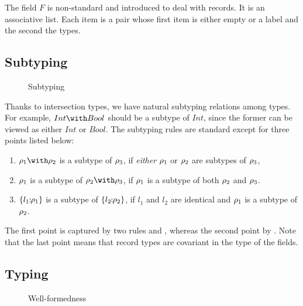 The field $ F $ is non-standard and introduced to deal with records. It is an
associative list. Each item is a pair whose first item is either empty or a
label and the second the types.




\subsection{Subtyping}

\begin{figure*}

\caption{Subtyping}
\end{figure*}

Thanks to intersection types, we have natural subtyping relations among types.
For example, $ Int \with Bool $ should be a subtype of $ Int $, since the former
can be viewed as either $ Int $ or $ Bool $. The subtyping rules are standard
except for three points listed below:
\begin{enumerate}
\item $ \ty_1 \with \ty_2 $ is a subtype of $ \rho_3 $, if \emph{either} $ \rho_1 $ or
  $ \rho_2 $ are subtypes of $ \rho_3 $,

\item $ \rho_1 $ is a subtype of $ \ty_2 \with \ty_3 $, if $ \rho_1 $ is a subtype of
  both $ \rho_2 $ and $ \rho_3 $.

\item $ \{ {l_1} \!\!:\!\! {\rho_1} \} $ is a subtype of $ \{ {l_2} \!\!:\!\! {\rho_2} \} $, if
  $ l_1 $ and $ l_2 $ are identical and $ \rho_1 $ is a subtype of $ \rho_2 $.
\end{enumerate}
The first point is captured by two rules  and ,
whereas the second point by . Note that the last point means
that record types are covariant in the type of the fields.

\subsection{Typing}

\begin{figure*}

\caption{Well-formedness}
\end{figure*}


